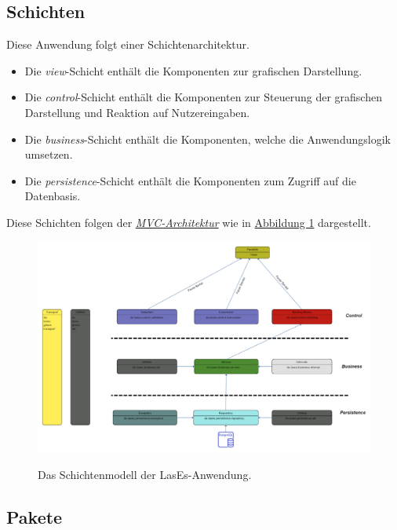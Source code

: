 
\subsection{Schichten}\label{arch:schichten}
Diese Anwendung folgt einer Schichtenarchitektur.
\begin{itemize}
    \item Die \emph{view}-Schicht enthält die Komponenten zur grafischen Darstellung.
    \item Die \emph{control}-Schicht enthält die Komponenten zur Steuerung der grafischen Darstellung und Reaktion auf
    Nutzereingaben.
    \item Die \emph{business}-Schicht enthält die Komponenten, welche die Anwendungslogik umsetzen.
    \item Die \emph{persistence}-Schicht enthält die Komponenten zum Zugriff auf die Datenbasis.
\end{itemize}
Diese Schichten folgen der \emph{\hyperref[arch:mvc]{MVC-Architektur}} wie in \hyperref[arch:pakdia]{Abbildung 1} dargestellt.
\begin{figure}[H]
\centering
    \includegraphics[width=\linewidth]{graphics/Paketdiagramm5.0}\label{arch:pakdia}
    \caption{Das Schichtenmodell der LasEs-Anwendung.}
\end{figure}


\subsection{Pakete}\label{arch:pakete}

